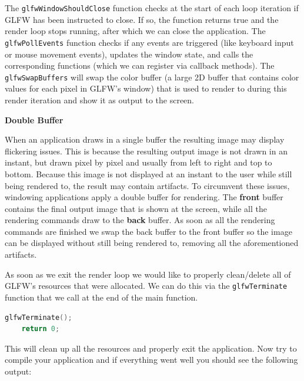 \newpage

\begin{important}
    The \verb|glfwWindowShouldClose| function checks at the start of each loop iteration if GLFW has been instructed to close. If so, the function returns true and the render loop stops running, after which we can close the application.
    The \verb|glfwPollEvents| function checks if any events are triggered (like keyboard input or mouse movement events), updates the window state, and calls the corresponding functions (which we can register via callback methods). The \verb|glfwSwapBuffers| will swap the color buffer (a large 2D buffer that contains color values for each pixel in GLFW's window) that is used to render to during this render iteration and show it as output to the screen.
\end{important}

\begin{note}
    \begin{center}
        \textbf{Double Buffer}
    \end{center}
    When an application draws in a single buffer the resulting image may display flickering issues. This is because the resulting output image is not drawn in an instant, but drawn pixel by pixel and usually from left to right and top to bottom. Because this image is not displayed at an instant to the user while still being rendered to, the result may contain artifacts. To circumvent these issues, windowing applications apply a double buffer for rendering. The \textbf{front} buffer contains the final output image that is shown at the screen, while all the rendering commands draw to the \textbf{back} buffer. As soon as all the rendering commands are finished we swap the back buffer to the front buffer so the image can be displayed without still being rendered to, removing all the aforementioned artifacts.
\end{note}

As soon as we exit the render loop we would like to properly clean/delete all of GLFW's resources that were allocated. We can do this via the \verb|glfwTerminate| function that we call at the end of the main function.

\begin{lstlisting}[language=C++]
    glfwTerminate();
    return 0;
\end{lstlisting}

This will clean up all the resources and properly exit the application. Now try to compile your application and if everything went well you should see the following output:

